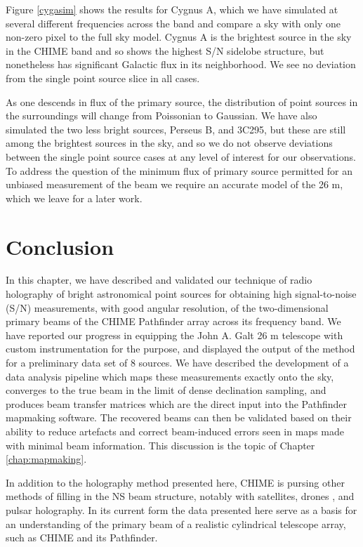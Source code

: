Figure \ref{cygasim} shows the results for Cygnus A, which we have simulated at several different frequencies across the band and compare a sky with only one non-zero pixel to the full sky model. Cygnus A is the brightest source in the sky in the CHIME band and so shows the highest S/N sidelobe structure, but nonetheless has significant Galactic flux in its neighborhood. We see no deviation from the single point source slice in all cases.

As one descends in flux of the primary source, the distribution of point sources in the surroundings will change from Poissonian to Gaussian. We have also simulated the two less bright sources, Perseus B, and 3C295, but these are still among the brightest sources in the sky, and so we do not observe deviations between the single point source cases at any level of interest for our observations. To address the question of the minimum flux of primary source permitted for an unbiased measurement of the beam we require an accurate model of the 26 m, which we leave for a later work.

\section{Conclusion} \label{ch:hol:sec:conclusion}

In this chapter, we have described and validated our technique of radio holography of bright astronomical point sources for obtaining high signal-to-noise (S/N) measurements, with good angular resolution, of the two-dimensional primary beams of the CHIME Pathfinder array across its frequency band. We have reported our progress in equipping the John A. Galt 26 m telescope with custom instrumentation for the purpose, and displayed the output of the method for a preliminary data set of 8 sources. We have described the development of a data analysis pipeline which maps these measurements exactly onto the sky, converges to the true beam in the limit of dense declination sampling, and produces beam transfer matrices which are the direct input into the Pathfinder mapmaking software. The recovered beams can then be validated based on their ability to reduce artefacts and correct beam-induced errors seen in maps made with minimal beam information. This discussion is the topic of Chapter \ref{chap:mapmaking}.

In addition to the holography method presented here, CHIME is pursing other methods of filling in the NS beam structure, notably with satellites\citep{hol2, sat2}, drones \citep{drone}, and pulsar holography. In its current form the data presented here serve as a basis for an understanding of the primary beam of a realistic cylindrical telescope array, such as CHIME and its Pathfinder.
